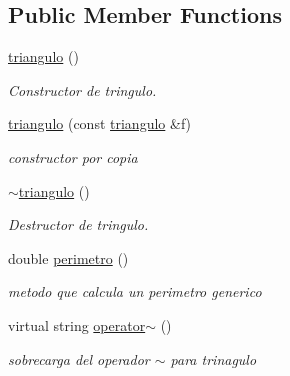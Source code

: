 \subsection*{Public Member Functions}
\begin{DoxyCompactItemize}
\item 
\mbox{\label{classtriangulo_acf725d8856047c7f34f3cc120845d61f}} 
\hyperlink{classtriangulo_acf725d8856047c7f34f3cc120845d61f}{triangulo} ()
\begin{DoxyCompactList}\small\item\em Constructor de tringulo. \end{DoxyCompactList}\item 
\hyperlink{classtriangulo_a427e664b4f57a7fbf3b86a7df08c34fe}{triangulo} (const \hyperlink{classtriangulo}{triangulo} \&f)
\begin{DoxyCompactList}\small\item\em constructor por copia \end{DoxyCompactList}\item 
\mbox{\label{classtriangulo_a8af9d6bbfd02ed3a82bd30147958ac34}} 
\hyperlink{classtriangulo_a8af9d6bbfd02ed3a82bd30147958ac34}{$\sim$triangulo} ()
\begin{DoxyCompactList}\small\item\em Destructor de tringulo. \end{DoxyCompactList}\item 
\mbox{\label{classtriangulo_a3e689f3bb9dad9e17766aa2adb060c16}} 
double \hyperlink{classtriangulo_a3e689f3bb9dad9e17766aa2adb060c16}{perimetro} ()
\begin{DoxyCompactList}\small\item\em metodo que calcula un perimetro generico \end{DoxyCompactList}\item 
\mbox{\label{classtriangulo_a21620f40b213174d311380b0343777cb}} 
virtual string \hyperlink{classtriangulo_a21620f40b213174d311380b0343777cb}{operator$\sim$} ()
\begin{DoxyCompactList}\small\item\em sobrecarga del operador $\sim$ para trinagulo \end{DoxyCompactList}\end{DoxyCompactItemize}
